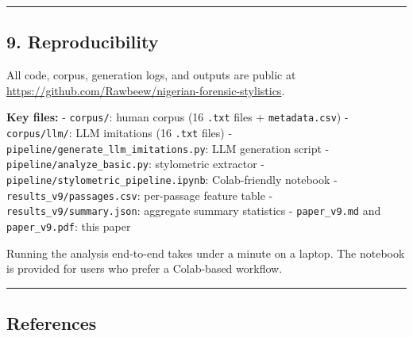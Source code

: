 \begin{center}\rule{0.5\linewidth}{0.5pt}\end{center}

\subsection{9. Reproducibility}\label{reproducibility}

All code, corpus, generation logs, and outputs are public at
\url{https://github.com/Rawbeew/nigerian-forensic-stylistics}.

\textbf{Key files:} - \texttt{corpus/}: human corpus (16 \texttt{.txt}
files + \texttt{metadata.csv}) - \texttt{corpus/llm/}: LLM imitations
(16 \texttt{.txt} files) -
\texttt{pipeline/generate\_llm\_imitations.py}: LLM generation script -
\texttt{pipeline/analyze\_basic.py}: stylometric extractor -
\texttt{pipeline/stylometric\_pipeline.ipynb}: Colab-friendly notebook -
\texttt{results\_v9/passages.csv}: per-passage feature table -
\texttt{results\_v9/summary.json}: aggregate summary statistics -
\texttt{paper\_v9.md} and \texttt{paper\_v9.pdf}: this paper

Running the analysis end-to-end takes under a minute on a laptop. The
notebook is provided for users who prefer a Colab-based workflow.

\begin{center}\rule{0.5\linewidth}{0.5pt}\end{center}

\subsection{References}\label{references}

